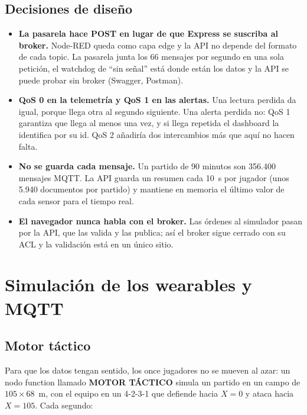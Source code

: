\documentclass[runningheads]{llncs}
\begin{document}
\subsection{Decisiones de diseño}

\begin{itemize}
  \item \textbf{La pasarela hace POST en lugar de que Express se suscriba al broker.} Node-RED queda como capa edge y la API no depende del formato de cada topic. La pasarela junta los 66 mensajes por segundo en una sola petición, el watchdog de ``sin señal'' está donde están los datos y la API se puede probar sin broker (Swagger, Postman).
  \item \textbf{QoS 0 en la telemetría y QoS 1 en las alertas.} Una lectura perdida da igual, porque llega otra al segundo siguiente. Una alerta perdida no: QoS 1 garantiza que llega al menos una vez, y si llega repetida el dashboard la identifica por su id. QoS 2 añadiría dos intercambios más que aquí no hacen falta.
  \item \textbf{No se guarda cada mensaje.} Un partido de 90 minutos son 356.400 mensajes MQTT. La API guarda un resumen cada 10~s por jugador (unos 5.940 documentos por partido) y mantiene en memoria el último valor de cada sensor para el tiempo real.
  \item \textbf{El navegador nunca habla con el broker.} Las órdenes al simulador pasan por la API, que las valida y las publica; así el broker sigue cerrado con su ACL y la validación está en un único sitio.
\end{itemize}

\section{Simulación de los wearables y MQTT}

\subsection{Motor táctico}

Para que los datos tengan sentido, los once jugadores no se mueven al azar: un nodo function llamado \textbf{MOTOR TÁCTICO} simula un partido en un campo de $105\times68$~m, con el equipo en un 4-2-3-1 que defiende hacia $X=0$ y ataca hacia $X=105$. Cada segundo:
\end{document}
